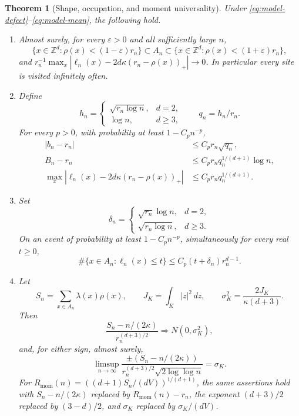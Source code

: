 \documentclass[11pt]{amsart}
\theoremstyle{plain}
\newtheorem{theorem}{Theorem}[section]
\theoremstyle{definition}
\numberwithin{equation}{section}
\newcommand{\Z}{\mathbb Z}
\newcommand{\Rmom}{R_{\mathrm{mom}}}
\begin{document}
\begin{theorem}[Shape, occupation, and moment universality]\label{thm:main}
Under \eqref{eq:model-defect}--\eqref{eq:model-mean}, the following hold.
\begin{enumerate}[label=\textup{(\roman*)},leftmargin=*]
\item Almost surely, for every $\varepsilon>0$ and all sufficiently
large $n$,
\[
 \{x\in\Z^d:\rho(x)<(1-\varepsilon)r_n\}
 \subset A_n\subset
 \{x\in\Z^d:\rho(x)<(1+\varepsilon)r_n\},
\]
and $r_n^{-1}\max_x|\ell_n(x)-2d\kappa(r_n-\rho(x))_+|\to0$.
In particular every site is visited infinitely often.

\item Define
\[
 h_n=\begin{cases}\sqrt{r_n\log n},&d=2,\\\log n,&d\ge3,
 \end{cases}\qquad q_n=h_n/r_n.
\]
For every $p>0$, with probability at least $1-C_pn^{-p}$,
\begin{align}
 |b_n-r_n|&\le C_pr_n\sqrt{q_n},\label{eq:main-inner}\\
 B_n-r_n&\le C_pr_nq_n^{1/(d+1)}\log n,\label{eq:main-outer}\\
 \max_x|\ell_n(x)-2d\kappa(r_n-\rho(x))_+|
 &\le C_pr_nq_n^{1/(d+1)}.\label{eq:main-profile}
\end{align}

\item Set
\[
 \delta_n=\begin{cases}\sqrt{r_n}\log n,&d=2,\\
 \sqrt{r_n\log n},&d\ge3.
 \end{cases}
\]
On an event of probability at least $1-C_pn^{-p}$, simultaneously
for every real $t\ge0$,
\begin{equation}\label{eq:main-occupation}
 \#\{x\in A_n:\ell_n(x)\le t\}
 \le C_p(t+\delta_n)r_n^{d-1}.
\end{equation}

\item Let
\[
 S_n=\sum_{x\in A_n}\lambda(x)\rho(x),\qquad
 J_K=\int_K|z|^2\,dz,\qquad
 \sigma_K^2=\frac{2J_K}{\kappa(d+3)}.
\]
Then
\begin{equation}\label{eq:main-moment-clt}
 \frac{S_n-n/(2\kappa)}{r_n^{(d+3)/2}}
 \Longrightarrow N(0,\sigma_K^2),
\end{equation}
and, for either sign, almost surely,
\begin{equation}\label{eq:main-moment-lil}
 \limsup_{n\to\infty}
 \frac{\pm(S_n-n/(2\kappa))}
 {r_n^{(d+3)/2}\sqrt{2\log\log n}}=\sigma_K.
\end{equation}
For $\Rmom(n)=((d+1)S_n/(dV))^{1/(d+1)}$, the same assertions
hold with $S_n-n/(2\kappa)$ replaced by $\Rmom(n)-r_n$,
the exponent $(d+3)/2$ replaced by $(3-d)/2$, and
$\sigma_K$ replaced by $\sigma_K/(dV)$.
\end{enumerate}
\end{theorem}
\end{document}
